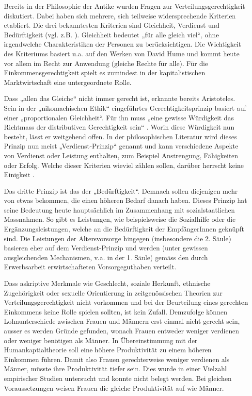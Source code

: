 \documentclass[a4paper,12pt]{article}
\renewcommand{\baselinestretch}{1.1}
\newif\ifcomments
\newcommand{\comment}[1]{%
    \ifcomments\marginpar{\renewcommand{\baselinestretch}{1}\tiny\hspace*{-1.1em}\colorbox{gray!20}%
    {\textcolor{red}{\parbox[t]{.9in}{\raggedright #1}}}}\fi}
\begin{document}
Bereits in der Philosophie der Antike wurden Fragen zur
Verteilungsgerechtigkeit diskutiert. Dabei haben sich mehrere, sich teilweise
widersprechende Kriterien etabliert. Die drei bekanntesten Kriterien sind
Gleichheit, Verdienst und Bedürftigkeit (vgl. z.B.
\citealp{Deutsch-1975,Miller-1992,Sabbagh-2001}). Gleichheit bedeutet „für alle
gleich viel“, ohne irgendwelche Charakteristiken der Personen zu
berücksichtigen. Die Wichtigkeit des Kriteriums basiert u.a. auf den Werken von
David Hume und kommt heute vor allem im Recht zur Anwendung (gleiche Rechte für
alle). Für die Einkommensgerechtigkeit spielt es zumindest in der
kapitalistischen Marktwirtschaft eine untergeordnete Rolle.

Dass „allen das Gleiche“ nicht immer gerecht ist, erkannte bereits Aristoteles.
Sein in der „nikomachischen Ethik“ eingeführtes Gerechtigkeitsprinzip basiert
auf einer „proportionalen Gleichheit“. Für ihn muss „eine gewisse Würdigkeit
das Richtmass der distributiven Gerechtigkeit sein“
\citep[107]{Aristoteles-1985}. Worin diese Würdigkeit nun besteht, lässt er
weitgehend offen. In der philosophischen Literatur wird dieses Prinzip nun
meist „Verdienst-Prinzip“ genannt und kann verschiedene Aspekte von Verdienst
oder Leistung enthalten, zum Beispiel Anstrengung, Fähigkeiten oder Erfolg.
Welche dieser Kriterien wieviel zählen sollen, darüber herrscht keine Einigkeit
\citep{Lamont-1994}.

Das dritte Prinzip ist das der „Bedürftigkeit“. Demnach sollen diejenigen mehr
von etwas bekommen, die einen höheren Bedarf danach haben. Dieses Prinzip hat
seine Bedeutung heute hauptsächlich im Zusammenhang mit sozialstaatlichen
Massnahmen. So gibt es Leistungen, wie beispielsweise die Sozialhilfe oder die
Ergänzungsleistungen, welche an die Bedürftigkeit der EmpfängerInnen geknüpft
sind. Die Leistungen der Altersvorsorge hingegen (insbesondere die 2. Säule)
basieren eher auf dem Verdienst-Prinzip und werden (unter gewissen
ausgleichenden Mechanismen, v.a. in der 1. Säule) gemäss den durch
Erwerbsarbeit erwirtschafteten Vorsorgeguthaben verteilt.

Dass askriptive Merkmale wie Geschlecht, soziale Herkunft, ethnische
Zugehörigkeit oder sexuelle Orientierung in zeitgenössischen Theorien zur
Verteilungsgerechtigkeit nicht vorkommen und bei der Beurteilung eines
gerechten Einkommens keine Rolle spielen sollten, ist kein Zufall.
\comment{(ggfs. Begründung mit Rawls, „Schleier des Nichtwissens“ oder so;
Rawls 1979)} Demzufolge können Lohnunterschiede zwischen Frauen und
Männern erst einmal nicht gerecht sein, ausser es werden Gründe gefunden,
wonach Frauen entweder weniger verdienen oder weniger benötigen als Männer. In
Übereinstimmung mit der Humankaptialtheorie
\citep{Becker-1975,Mincer-Polachek-1974} soll eine höhere Produktivität zu
einem höheren Einkommen führen. Damit also Frauen gerechterweise weniger
verdienen als Männer, müsste ihre Produktivität tiefer sein. Dies wurde in
einer Vielzahl empirischer Studien untersucht und konnte nicht belegt werden.
Bei gleichen Voraussetzungen weisen Frauen die gleiche Produktivität auf wie
Männer.
\end{document}
